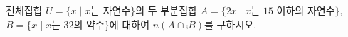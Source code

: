 전체집합 $U=\{x \mid x$는 자연수$\}$의 두 부분집합 $A=\{2x \mid x$는 $15$ 이하의 자연수$\}$, $B=\{x \mid x$는 $32$의 약수$\}$에 대하여 $n(A\cap\comp{B})$를 구하시오.
